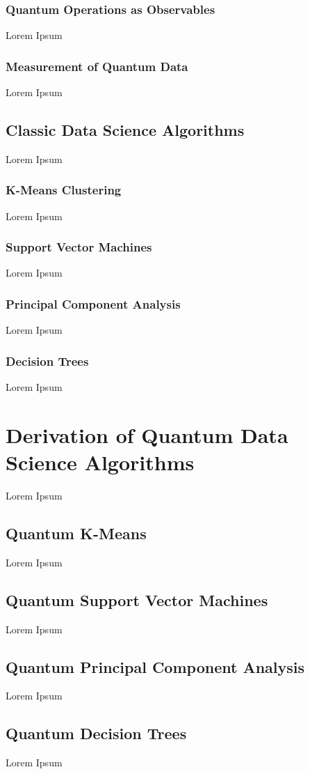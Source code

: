 \documentclass[conference]{IEEEtran}
\begin{document}
\subsubsection{Quantum Operations as Observables}
Lorem Ipsum
\subsubsection{Measurement of Quantum Data}
Lorem Ipsum

\subsection{Classic Data Science Algorithms}
Lorem Ipsum
\subsubsection{K-Means Clustering}
Lorem Ipsum
\subsubsection{Support Vector Machines}
Lorem Ipsum
\subsubsection{Principal Component Analysis}
Lorem Ipsum
\subsubsection{Decision Trees}
Lorem Ipsum



\section{Derivation of Quantum Data Science Algorithms}
Lorem Ipsum
\subsection{Quantum K-Means}
Lorem Ipsum
\subsection{Quantum Support Vector Machines}
Lorem Ipsum
\subsection{Quantum Principal Component Analysis}
Lorem Ipsum
\subsection{Quantum Decision Trees}
Lorem Ipsum
\end{document}
